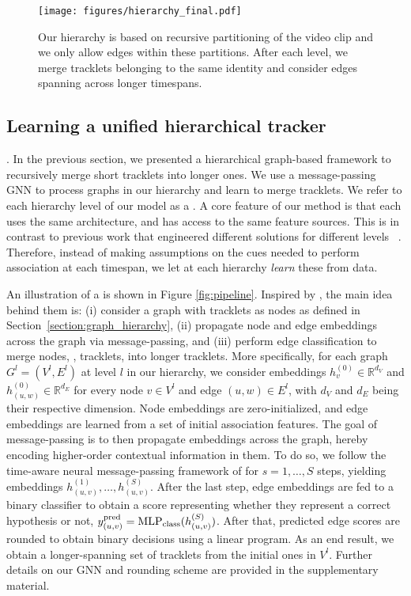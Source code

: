 \documentclass[10pt,twocolumn,letterpaper]{article}
\begin{document}
{{\begin{figure}
\centering
\texttt{[image: figures/hierarchy\_final.pdf]}
\caption{ Our hierarchy is based on recursive partitioning of the video clip and we only allow edges within these partitions. After each level, we merge tracklets belonging to the same identity and consider edges spanning across longer timespans. }
\label{fig:hierarchy}
\end{figure}

\subsection{Learning a unified hierarchical tracker} \label{features}
. In the previous section, we presented a hierarchical graph-based framework to recursively merge short tracklets into longer ones. We use a message-passing GNN to process graphs in our hierarchy and learn to merge tracklets. We refer to each hierarchy level of our model as a \textit{\blockname}. A core feature of our method is that each \blockname uses the same architecture, and has access to the same feature sources. This is in contrast to previous work that engineered different solutions for different levels ~\cite{mpntrack, lift, aplift, lpc}. Therefore, instead of making assumptions on the cues needed to perform association at each timespan, we let \blocknameplural at each hierarchy \textit{learn} these from data.

 An illustration of a \blockname is shown in Figure \ref{fig:pipeline}. Inspired by \cite{mpntrack}, the main idea behind them is: (i) consider a graph with tracklets as nodes as defined in Section~\ref{section:graph_hierarchy}, (ii) propagate node and edge embeddings across the graph via message-passing, and (iii) perform edge classification to merge nodes, \ie, tracklets, into longer tracklets. 
More specifically, for each graph $G^l=(V^l, E^l)$ at level $l$ in our hierarchy, we consider embeddings $h^{(0)}_v\in \mathbb{R}^{d_V}$ and $h^{(0)}_{(u, w)}\in \mathbb{R}^{d_E}$ for every node $v\in V^l$ and edge $(u, w)\in E^l$, with $d_V$ and $d_E$ being their respective dimension. 
Node embeddings are zero-initialized, and edge embeddings are learned from a set of initial association features.
The goal of message-passing is to then propagate embeddings across the graph, hereby encoding higher-order contextual information in them. To do so, we follow the time-aware neural message-passing framework of \cite{mpntrack} for $s=1, \dots, S$ steps, yielding embeddings $h^{(1)}_{(u, v)}, \dots, h^{(S)}_{(u, v)}$. 
After the last step, edge embeddings are fed to a binary classifier to obtain a score representing whether they represent a correct hypothesis or not, $y_{(u, v)}^{\text{pred}}= {\text{MLP}}_{\text{class}}(h^{(S)}_{(u, v)})$. After that, predicted edge scores are rounded to obtain binary decisions using a linear program. As an end result, we obtain a longer-spanning set of tracklets from the initial ones in $V^l$. Further details on our GNN and rounding scheme are provided in the supplementary material.


}}
\end{document}
